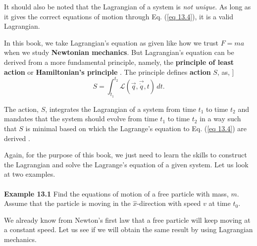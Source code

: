 \documentclass{article}
\begin{document}
It should also be noted that the Lagrangian of a system is \textit{not unique}. As long as it 
gives the correct equations of motion through Eq. (\ref{eq 13.4}), it is a valid Lagrangian.

In this book, we take Lagrangian's equation as given like how we trust $F=ma$ when we study
\textbf{Newtonian mechanics}. But Lagrangian's equation can be derived from a more
fundamental principle, namely, the \textbf{principle of least action} or \textbf{Hamiltonian's principle}
\cite{Landau}. The principle defines \textbf{action} $S$, as,
]\begin{equation}\label{eq 13.5}
    S=\int_{t_1}^{t_2}\mathcal{L}(\vec{q},\vec{\dot{q}},t)  \,dt.\tag{13.5} 
\end{equation}

The action, $S$, integrates the Lagrangian of a system from time $t_1$ to time $t_2$ and
mandates that the system should evolve from time $t_1$ to time $t_2$ in a way such that $S$
is minimal based on which the Lagrange's equation to Eq. (\ref{eq 13.4}) are derived \cite{Landau}.

Again, for the purpose of this book, we just need to learn the skills to construct the Lagrangian and solve
the Lagrange's equation of a given system. Let us look at two examples.
\\\\
\textbf{Example 13.1} Find the equations of motion of a free particle with mass, $m$.
Assume that the particle is moving in the $\hat{x}$-direction with speed $v$ at time $t_0$.

We already know from Newton's first law that a free particle will keep moving at a constant
speed. Let us see if we will obtain the same result by using Lagrangian mechanics.
\end{document}

